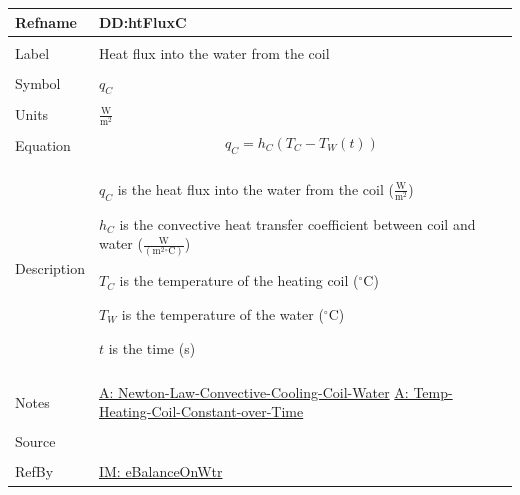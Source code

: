 \documentclass[12pt]{article}
\begin{document}
\noindent \begin{minipage}{\textwidth}
\begin{tabular}{>{\raggedright}p{}>{\raggedright\arraybackslash}p{}}
\toprule \textbf{Refname} & \textbf{DD:htFluxC}
\label{DD:htFluxC}
\\ \midrule \\
Label & Heat flux into the water from the coil
\\ \midrule \\
Symbol & ${q_{C}}$
\\ \midrule \\
Units & $\frac{\text{W}}{\text{m}^{2}}$
\\ \midrule \\
Equation & \begin{displaymath}
           {q_{C}}={h_{C}} \left({T_{C}}-{T_{W}}\left(t\right)\right)
           \end{displaymath}
\\ \midrule \\
Description & \begin{symbDescription}
              \item{${q_{C}}$ is the heat flux into the water from the coil ($\frac{\text{W}}{\text{m}^{2}}$)}
              \item{${h_{C}}$ is the convective heat transfer coefficient between coil and water ($\frac{\text{W}}{(\text{m}^{2}{}^{\circ}\text{C})}$)}
              \item{${T_{C}}$ is the temperature of the heating coil (${}^{\circ}$C)}
              \item{${T_{W}}$ is the temperature of the water (${}^{\circ}$C)}
              \item{$t$ is the time (s)}
              \end{symbDescription}
\\ \midrule \\
Notes & \hyperref[assumpLCCCW]{A: Newton-Law-Convective-Cooling-Coil-Water}
        \hyperref[assumpTHCCoT]{A: Temp-Heating-Coil-Constant-over-Time}
\\ \midrule \\
Source & \cite{koothoor2013}
\\ \midrule \\
RefBy & \hyperref[IM:eBalanceOnWtr]{IM: eBalanceOnWtr}
\\ \bottomrule \end{tabular}
\end{minipage}
\end{document}
